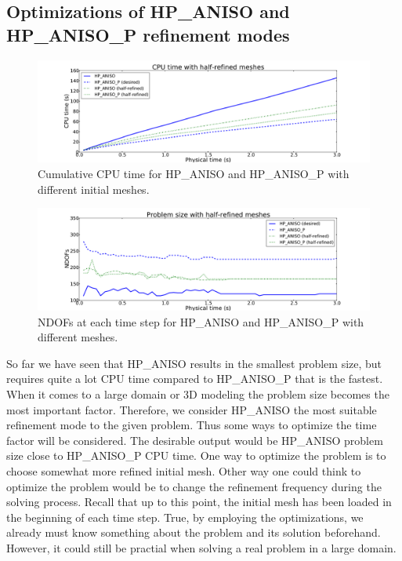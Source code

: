 \subsection{Optimizations of HP\_ANISO and HP\_ANISO\_P refinement modes}

\begin{figure}[!ht]
  \begin{centering}
  \includegraphics[width=\columnwidth]{refined_cpu}
  \caption{\label{fig:refined-cpu} Cumulative CPU time for HP\_ANISO and HP\_ANISO\_P
  with different initial meshes.}
  \end{centering}
\end{figure}

\begin{figure}[!ht]
  \begin{centering}
  \includegraphics[width=\columnwidth]{refined_dof}
  \caption{\label{fig:refined-dof} NDOFs at each time step for
  HP\_ANISO and HP\_ANISO\_P with different meshes.}
  \end{centering}
\end{figure}

So far we have seen that HP\_ANISO results in the smallest problem size, but requires
quite a lot CPU time compared to HP\_ANISO\_P that is the fastest.
When it comes to a large domain or 3D modeling the problem
size becomes the most important factor. Therefore, we consider HP\_ANISO the most
suitable refinement mode to the given problem. Thus some ways to optimize the time
factor will be considered. The desirable output would be HP\_ANISO problem size
close to HP\_ANISO\_P CPU time. One way to optimize the problem
is to choose somewhat more refined initial mesh. Other way one could think
to optimize the problem would be to change
the refinement frequency during the solving process. Recall that up to this point,
the initial mesh has been loaded in the beginning of each time step. True,
by employing the optimizations, we already must know something about the problem
and its solution beforehand. However, it could still be practial when solving a real problem
in a large domain.

